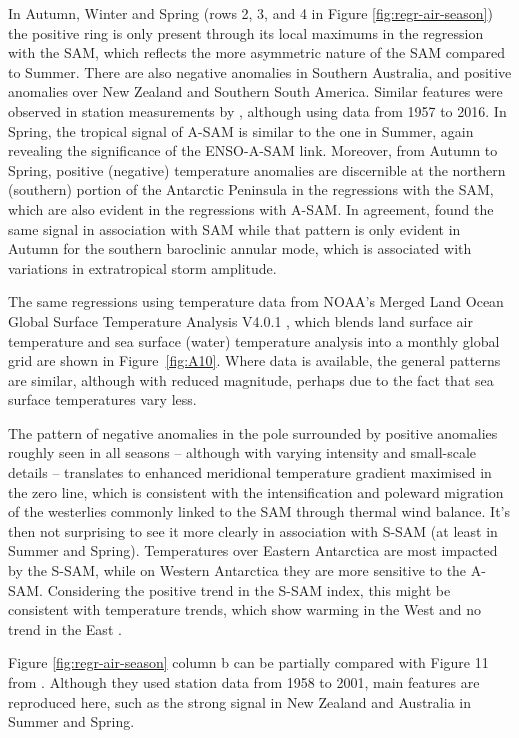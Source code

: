\documentclass[smallextended]{svjour3}       %
\begin{document}
In Autumn, Winter and Spring (rows 2, 3, and 4 in Figure \ref{fig:regr-air-season}) the positive ring is only present through its local maximums in the regression with the SAM, which reflects the more asymmetric nature of the SAM compared to Summer.
There are also negative anomalies in Southern Australia, and positive anomalies over New Zealand and Southern South America.
Similar features were observed in station measurements by \citet{jones2019}, although using data from 1957 to 2016.
In Spring, the tropical signal of A\nobreakdash-SAM is similar to the one in Summer, again revealing the significance of the ENSO-A\nobreakdash-SAM link.
Moreover, from Autumn to Spring, positive (negative) temperature anomalies are discernible at the northern (southern) portion of the Antarctic Peninsula in the regressions with the SAM, which are also evident in the regressions with A-SAM. In agreement, \citet{marshall2016} found the same signal in association with SAM while that pattern is only evident in Autumn for the southern baroclinic annular mode, which is associated with variations in extratropical storm amplitude.

The same regressions using temperature data from NOAA's Merged Land Ocean Global Surface Temperature Analysis V4.0.1 \citep{smith2008, vose2012}, which blends land surface air temperature and sea surface (water) temperature analysis into a monthly global grid are shown in Figure~\ref{fig:A10}.
Where data is available, the general patterns are similar, although with reduced magnitude, perhaps due to the fact that sea surface temperatures vary less.

The pattern of negative anomalies in the pole surrounded by positive anomalies roughly seen in all seasons -- although with varying intensity and small-scale details -- translates to enhanced meridional temperature gradient maximised in the zero line, which is consistent with the intensification and poleward migration of the westerlies commonly linked to the SAM through thermal wind balance.
It's then not surprising to see it more clearly in association with S\nobreakdash-SAM (at least in Summer and Spring).
Temperatures over Eastern Antarctica are most impacted by the S\nobreakdash-SAM, while on Western Antarctica they are more sensitive to the A\nobreakdash-SAM.
Considering the positive trend in the S\nobreakdash-SAM index, this might be consistent with temperature trends, which show warming in the West and no trend in the East \citep{nicolas2014}.

Figure \ref{fig:regr-air-season} column b can be partially compared with Figure 11 from \citet{fogt2012}.
Although they used station data from 1958 to 2001, main features are reproduced here, such as the strong signal in New Zealand and Australia in Summer and Spring.
\end{document}
